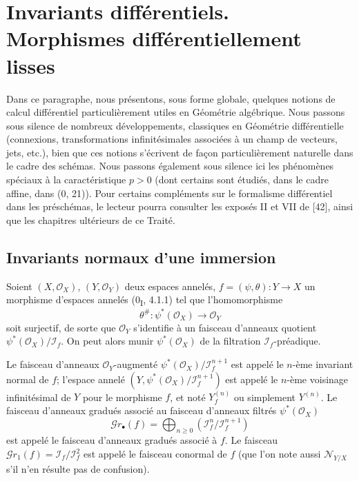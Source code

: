 \section{Invariants différentiels. Morphismes différentiellement lisses}
\label{section:IV.16}

Dans ce paragraphe, nous présentons, sous forme globale, quelques notions de
calcul différentiel particulièrement utiles en Géométrie algébrique. Nous passons sous
silence de nombreux développements, classiques en Géométrie différentielle (connexions,
transformations infinitésimales associées à un champ de vecteurs, jets, etc.), bien que ces
notions s'écrivent de façon particulièrement naturelle dans le cadre des schémas. Nous
passons également sous silence ici les phénomènes spéciaux à la caractéristique $p>0$
(dont certains sont étudiés, dans le cadre affine, dans (0, 21)). Pour certains compléments
sur le formalisme différentiel dans les préschémas, le lecteur pourra consulter les
exposés II et VII de [42], ainsi que les chapitres ultérieurs de ce Traité.

\subsection{Invariants normaux d'une immersion}

\begin{env}[16.1.1]
\label{IV.16.1.1}
Soient $(X,\mathcal{O}_X)$, $(Y,\mathcal{O}_Y)$ deux espaces annelés,
$f=(\psi,\theta):Y\to X$ un morphisme d'espaces annelés (0\textsubscript{I}, 4.1.1)
tel que l'homomorphisme
\[
  \theta^\#:\psi^*(\mathcal{O}_X)\longrightarrow\mathcal{O}_Y
\]
soit surjectif, de sorte que $\mathcal{O}_Y$ s'identifie à un faisceau d'anneaux quotient
$\psi^*(\mathcal{O}_X)/\mathscr{I}_f$. On peut alors munir
$\psi^*(\mathcal{O}_X)$ de la filtration $\mathscr{I}_f$-préadique.
\end{env}

\begin{definition}[16.1.2]
Le faisceau d'anneaux $\mathcal{O}_Y$-augmenté
$\psi^*(\mathcal{O}_X)/\mathscr{I}_f^{n+1}$ est appelé le $n$-ème invariant normal
de $f$; l'espace annelé
$(Y,\psi^*(\mathcal{O}_X)/\mathscr{I}_f^{n+1})$ est appelé le $n$-ème voisinage
infinitésimal de $Y$ pour le morphisme $f$, et noté $Y_f^{(n)}$ ou simplement
$Y^{(n)}$. Le faisceau d'anneaux gradués associé au faisceau d'anneaux filtrés
$\psi^*(\mathcal{O}_X)$
\[
  \mathscr{G}r_\bullet(f)=\bigoplus_{n\geq 0}
  (\mathscr{I}_f^n/\mathscr{I}_f^{n+1})
  \tag{16.1.2.1}
  \label{IV.16.1.2.1}
\]
est appelé le faisceau d'anneaux gradués associé à $f$. Le faisceau
$\mathscr{G}r_1(f)=\mathscr{I}_f/\mathscr{I}_f^2$ est appelé le faisceau conormal
de $f$ (que l'on note aussi $\mathscr{N}_{Y/X}$ s'il n'en résulte pas de confusion).
\end{definition}

